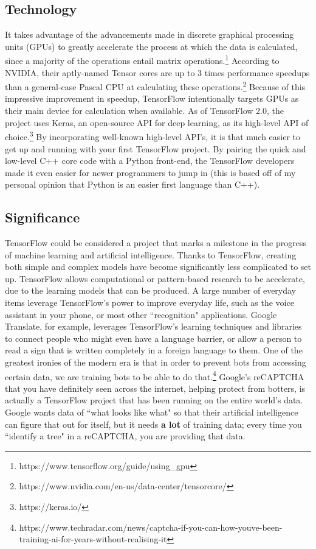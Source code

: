 \documentclass[12pt]{article}
\begin{document}
	\subsection{Technology}
	It takes advantage of the advancements made in discrete graphical processing units (GPUs) to greatly accelerate the process at which the data is calculated, since a majority of the operations entail matrix operations.\footnote{https://www.tensorflow.org/guide/using\_gpu} According to NVIDIA, their aptly-named Tensor cores are up to 3 times performance speedups than a general-case Pascal CPU at calculating these operations.\footnote{https://www.nvidia.com/en-us/data-center/tensorcore/} Because of this impressive improvement in speedup, TensorFlow intentionally targets GPUs as their main device for calculation when available. As of TensorFlow 2.0, the project uses Keras, an open-source API for deep learning, as its high-level API of choice.\footnote{https://keras.io/} By incorporating well-known high-level API's, it is that much easier to get up and running with your first TensorFlow project. By pairing the quick and low-level C++ core code with a Python front-end, the TensorFlow developers made it even easier for newer programmers to jump in (this is based off of my personal opinion that Python is an easier first language than C++).
	
	\subsection{Significance}
	TensorFlow could be considered a project that marks a milestone in the progress of machine learning and artificial intelligence. Thanks to TensorFlow, creating both simple and complex models have become significantly less complicated to set up. TensorFlow allows computational or pattern-based research to be accelerate, due to the learning models that can be produced. A large number of everyday items leverage TensorFlow's power to improve everyday life, such as the voice assistant in your phone, or most other ``recognition" applications. Google Translate, for example, leverages TensorFlow's learning techniques and libraries to connect people who might even have a language barrier, or allow a person to read a sign that is written completely in a foreign language to them. One of the greatest ironies of the modern era is that in order to prevent bots from accessing certain data, we are training bots to be able to do that.\footnote{https://www.techradar.com/news/captcha-if-you-can-how-youve-been-training-ai-for-years-without-realising-it} Google's reCAPTCHA that you have definitely seen across the internet, helping protect from botters, is actually a TensorFlow project that has been running on the entire world's data. Google wants data of ``what looks like what" so that their artificial intelligence can figure that out for itself, but it needs {\bf a lot} of training data; every time you ``identify a tree" in a reCAPTCHA, you are providing that data.
	
\end{document}
